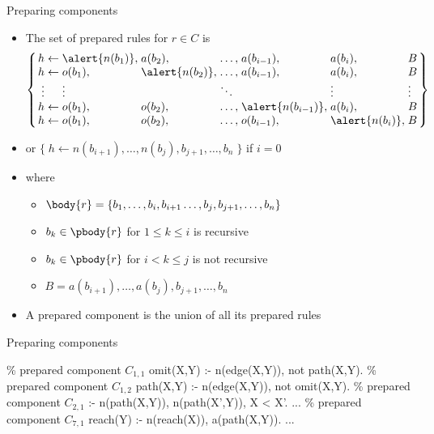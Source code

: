 \begin{frame}{Preparing components}

  \begin{itemize}
  \item The set of \alert{prepared rules} for \(r \in C\) is
    \[\arraycolsep=1.4pt
      \left\{
        \begin{array}{rcllllllll}
               h&\leftarrow&\alert{n(b_1)},&       a(b_2) ,&\dots,&       a(b_{i-1}) ,&       a(b_i), & B      \\
               h&\leftarrow&       o(b_1) ,&\alert{n(b_2)},&\dots,&       a(b_{i-1}) ,&       a(b_i), & B      \\
          \vdots&          &\vdots         &               &\ddots&                   &\vdots         & \vdots \\
               h&\leftarrow&       o(b_1) ,&       o(b_2) ,&\dots,&\alert{n(b_{i-1})},&       a(b_i), & B      \\
               h&\leftarrow&       o(b_1) ,&       o(b_2) ,&\dots,&       o(b_{i-1}) ,&\alert{n(b_i)},& B
        \end{array}
      \right\}
    \]
  \item [] or \quad \(\{\;h \leftarrow n(b_{i+1}), \dots, n(b_j), b_{j+1}, \dots, b_n\;\}\) \quad if \(i=0\)
  \item [] where
    \begin{itemize}
    \item \(\body{r} = \{ b_1, \dots, b_i, b_{i+1} \dots, b_j, b_{j+1}, \dots, b_n \}\)
    \item \(b_k\in\pbody{r}\) for \(1\leq k \leq i\) is recursive
    \item \(b_k\in\pbody{r}\) for \(i< k \leq j\) is not recursive
    \item \(B = a(b_{i+1}), \dots, a(b_j), b_{j+1}, \dots, b_n\)
    \end{itemize}
  \item<2-> A \alert{prepared component} is the union of all its prepared rules
  \end{itemize}
\end{frame}
\begin{frame}[fragile]{Preparing components}

\begin{SemiVerbatim}{.9}
{\color{comment}\% prepared component \(C_{1,1}\)}
omit(X,Y) :- \alert{n(edge(X,Y))}, not path(X,Y).
{\color{comment}\% prepared component \(C_{1,2}\)}
path(X,Y) :- \alert{n(edge(X,Y))}, not omit(X,Y).
{\color{comment}\% prepared component \(C_{2,1}\)}
:- \alert{n(path(X,Y))}, \alert{n(path(X',Y))}, X < X'.
...
{\color{comment}\% prepared component \(C_{7,1}\)}
reach(Y) :- \alert{n(reach(X))}, \alert{a(path(X,Y))}.
...
\end{SemiVerbatim}
\end{frame}
